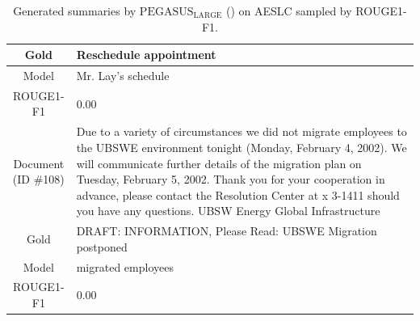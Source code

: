 \begin{table}[bth!]
\begin{tabular}{c|p{}}
\\ \hline
Gold & 
Reschedule appointment
\\ \hline
Model & 
Mr. Lay's schedule
\\ \hline
ROUGE1-F1 & 
0.00
\\ \hline
\makecell{Document\\(ID \#108)} & 
Due to a variety of circumstances we did not migrate employees to the UBSWE environment tonight (Monday, February 4, 2002). We will communicate further details of the migration plan on Tuesday, February 5, 2002. Thank you for your cooperation in advance, please contact the Resolution Center at x 3-1411 should you have any questions. UBSW Energy Global Infrastructure
\\ \hline
Gold & 
DRAFT: INFORMATION, Please Read: UBSWE Migration postponed
\\ \hline
Model & 
migrated employees
\\ \hline
ROUGE1-F1 & 
0.00
\\ \hline
\end{tabular}
\caption{Generated summaries by $\text{PEGASUS}_{\text{LARGE}}$ (\gnews) on AESLC sampled by ROUGE1-F1.}
\end{table}